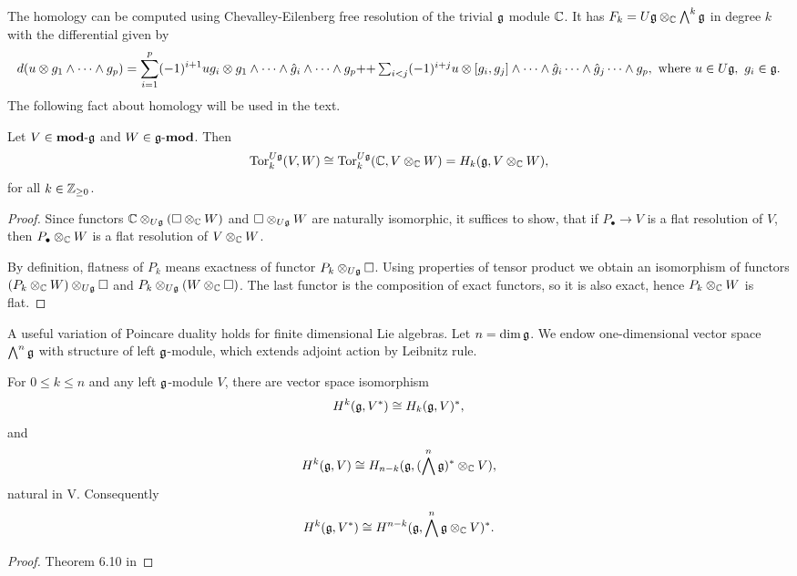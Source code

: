 The homology can be computed using Chevalley-Eilenberg  free resolution of the trivial $\mathfrak{g}$
module $\mathbb{C}$. It has $F_k=U\mathfrak{g}\otimes_{\mathbb{C}} \bigwedge^k \mathfrak{g}$ in degree $k$ with the
differential given by
\begin{equation}
    d(u\otimes g_1 \wedge \cdots \wedge g_p) 
 = \sum_{i = 1}^p (-1)^{i+1} u g_i \otimes g_1 \wedge \cdots \wedge \hat{g}_i\wedge \cdots \wedge g_p  
+$$ $$+\sum_{i < j} (-1)^{i+j} u\otimes [g_i, g_j] \wedge \cdots \wedge \hat{g}_i\cdots \wedge
\hat{g}_j\cdots \wedge g_p,~\text{where } u\in U\lieg,~g_i \in \lieg.
\end{equation}
The following fact about homology will be used in the text.
\begin{lemma} \label{t:torhomology}
   Let $V \in \operatorname{\mathbf{mod-\mathfrak{g}}}$ and $W \in \operatorname{\mathbf{\mathfrak{g}-mod}}$. Then  
    \[
        \mathrm{Tor}_k^{U\mathfrak{g}}(V,W) \cong \mathrm{Tor}_k^{U\mathfrak{g}}(\mathbb{C},V\otimes_{\mathbb{C}} W) = H_k(\mathfrak{g}, V\otimes_{\mathbb{C}} W),
    \]
    for all $k\in \mathbb{Z}_{\geq 0}$.
\end{lemma}
\begin{proof}
    Since functors $\mathbb{C}\otimes_{U\mathfrak{g}}(\square \otimes_{\mathbb{C}} W)$ and $\square \otimes_{U\mathfrak{g}} W$
    are naturally isomorphic, it suffices to show, that if $P_\bullet \to V$ is a flat
    resolution of $V$, then $P_\bullet \otimes_{\mathbb{C}} W$ is a flat resolution of $V\otimes_{\mathbb{C}}
    W$.

    By definition, flatness of $P_k$ means exactness of functor $P_k\otimes_{U\mathfrak{g}}\square$. Using
    properties of tensor product we obtain an isomorphism of functors $(P_k\otimes_{\mathbb{C}} W) 
    \otimes_{U\mathfrak{g}} \square$ and $P_k\otimes_{U\mathfrak{g}} (W \otimes_{\mathbb{C}} \square)$. The last functor
    is the composition of exact functors, so it is also exact, hence $P_k\otimes_{\mathbb{C}} W$ is flat.
\end{proof}

A useful variation of Poincare duality holds for finite dimensional Lie algebras. Let $n = \dim
\mathfrak{g}$. We endow one-dimensional vector space $\bigwedge^n \mathfrak{g}$ 
with structure of left $\mathfrak{g}$-module, which extends adjoint action by Leibnitz rule. 

\begin{theorem} \label{t:poincare}
    For $0 \leq k \leq n$ and any left $\mathfrak{g}$-module $V$, there are vector space isomorphism 
    \[
        H^k(\mathfrak{g}, V^*) \cong H_k(\mathfrak{g}, V)^*,
    \]
    and
    \[
        H^k(\mathfrak{g}, V) \cong H_{n - k}(\mathfrak{g}, (\bigwedge^n \mathfrak{g})^*\otimes_{\mathbb{C}} V),
    \]
    natural in V. Consequently
    \[
        H^k(\mathfrak{g}, V^*) \cong H^{n - k}(\mathfrak{g},  \bigwedge^n \mathfrak{g}\otimes_{\mathbb{C}} V)^*. 
    \]
\end{theorem}
\begin{proof}
    Theorem 6.10 in 
\end{proof}
